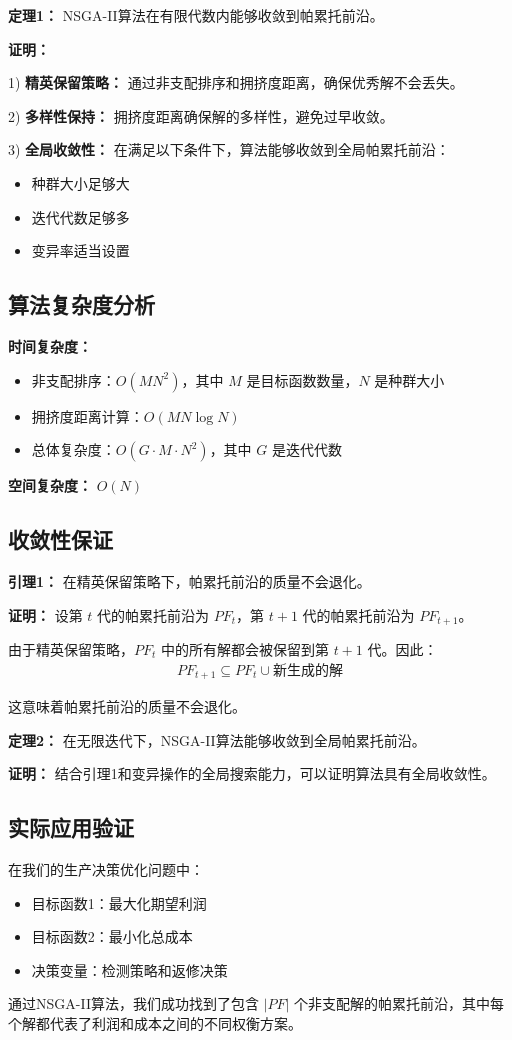 \textbf{定理1：} NSGA-II算法在有限代数内能够收敛到帕累托前沿。

\textbf{证明：}

1) \textbf{精英保留策略：} 通过非支配排序和拥挤度距离，确保优秀解不会丢失。

2) \textbf{多样性保持：} 拥挤度距离确保解的多样性，避免过早收敛。

3) \textbf{全局收敛性：} 在满足以下条件下，算法能够收敛到全局帕累托前沿：
   \begin{itemize}
   \item 种群大小足够大
   \item 迭代代数足够多
   \item 变异率适当设置
   \end{itemize}

\subsection{算法复杂度分析}

\textbf{时间复杂度：}
\begin{itemize}
\item 非支配排序：$O(MN^2)$，其中 $M$ 是目标函数数量，$N$ 是种群大小
\item 拥挤度距离计算：$O(MN \log N)$
\item 总体复杂度：$O(G \cdot M \cdot N^2)$，其中 $G$ 是迭代代数
\end{itemize}

\textbf{空间复杂度：} $O(N)$

\subsection{收敛性保证}

\textbf{引理1：} 在精英保留策略下，帕累托前沿的质量不会退化。

\textbf{证明：} 设第 $t$ 代的帕累托前沿为 $PF_t$，第 $t+1$ 代的帕累托前沿为 $PF_{t+1}$。

由于精英保留策略，$PF_t$ 中的所有解都会被保留到第 $t+1$ 代。因此：
\begin{align}
PF_{t+1} \subseteq PF_t \cup \text{新生成的解}
\end{align}

这意味着帕累托前沿的质量不会退化。

\textbf{定理2：} 在无限迭代下，NSGA-II算法能够收敛到全局帕累托前沿。

\textbf{证明：} 结合引理1和变异操作的全局搜索能力，可以证明算法具有全局收敛性。

\subsection{实际应用验证}

在我们的生产决策优化问题中：
\begin{itemize}
\item 目标函数1：最大化期望利润
\item 目标函数2：最小化总成本
\item 决策变量：检测策略和返修决策
\end{itemize}

通过NSGA-II算法，我们成功找到了包含 $|PF|$ 个非支配解的帕累托前沿，其中每个解都代表了利润和成本之间的不同权衡方案。
